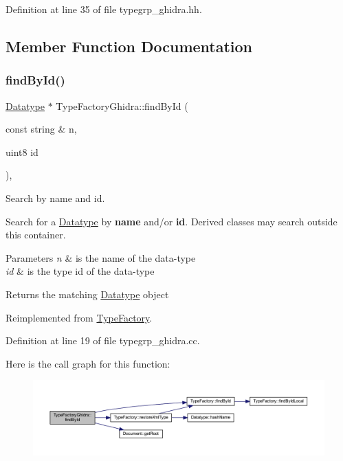 Definition at line 35 of file typegrp\+\_\+ghidra.\+hh.



\subsection{Member Function Documentation}
\mbox{\label{class_type_factory_ghidra_a494fd9c2fb18db1b1f9ee4d7078d590c}} 
\subsubsection{\texorpdfstring{findById()}{findById()}}
{\footnotesize\ttfamily \mbox{\hyperlink{class_datatype}{Datatype}} $\ast$ Type\+Factory\+Ghidra\+::find\+By\+Id (\begin{DoxyParamCaption}\item[{const string \&}]{n,  }\item[{uint8}]{id }\end{DoxyParamCaption})\hspace{0.3cm}{\ttfamily [protected]}, {\ttfamily [virtual]}}



Search by name and id. 

Search for a \mbox{\hyperlink{class_datatype}{Datatype}} by {\bfseries{name}} and/or {\bfseries{id}}. Derived classes may search outside this container. 
\begin{DoxyParams}{Parameters}
{\em n} & is the name of the data-\/type \\
\hline
{\em id} & is the type id of the data-\/type \\
\hline
\end{DoxyParams}
\begin{DoxyReturn}{Returns}
the matching \mbox{\hyperlink{class_datatype}{Datatype}} object 
\end{DoxyReturn}


Reimplemented from \mbox{\hyperlink{class_type_factory_a79cd8d76884043080a3430f3aff8b010}{Type\+Factory}}.



Definition at line 19 of file typegrp\+\_\+ghidra.\+cc.

Here is the call graph for this function\+:
\nopagebreak
\begin{figure}[H]
\begin{center}
\leavevmode
\includegraphics[width=350pt]{class_type_factory_ghidra_a494fd9c2fb18db1b1f9ee4d7078d590c_cgraph}
\end{center}
\end{figure}


